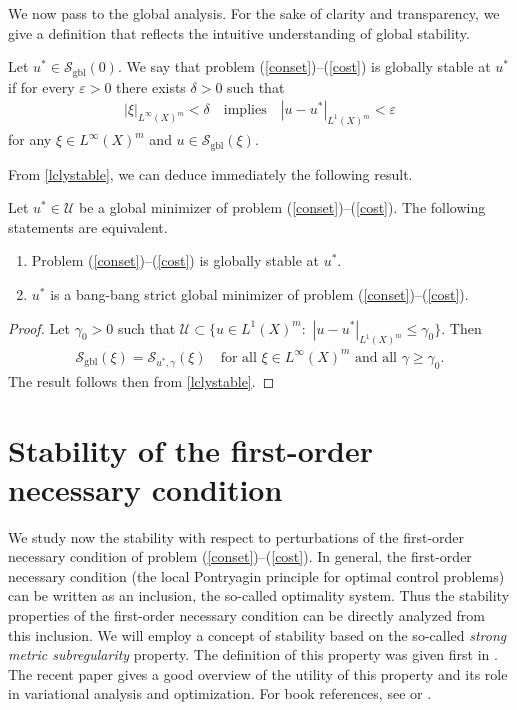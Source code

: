 \documentclass[hidelinks,onefignum,onetabnum]{siamart220329}
\begin{document}
We now pass to the global analysis. For the sake of clarity and transparency, we give a definition that  reflects the intuitive understanding of global stability.

\begin{definition}\label{locdefgbl}
	Let $u^*\in\mathcal S_{\text{gbl}}(0)$. We say that problem (\ref{conset})--(\ref{cost}) is globally stable at $u^*$ if for every $\varepsilon>0$ there exists $\delta>0$ such that 
	\begin{align*}
		|\xi|_{{L^\infty(X)^m}}<\delta \quad\text{implies}\quad |u-u^*|_{{L^1(X)^m}}<\varepsilon
	\end{align*}
	for any $\xi\in L^\infty(X)^m$ and  $u\in\mathcal S_{\text{gbl}}(\xi)$.
\end{definition}

From \cref{lclystable}, we can deduce immediately the following result.

\begin{corollary}
	Let $u^*\in\mathcal U$ be a global minimizer of problem (\ref{conset})--(\ref{cost}). The following statements are equivalent.
	\begin{enumerate}
		\item Problem (\ref{conset})--(\ref{cost}) is  globally stable at $u^*$.
		
		\item $u^*$ is a bang-bang strict global minimizer of problem (\ref{conset})--(\ref{cost}).
	\end{enumerate}
\end{corollary}
\begin{proof}
	Let $\gamma_0>0$ such that $\mathcal U\subset\{u\in L^1(X)^m:\,\, |u-u^*|_{L^1(X)^m}\le\gamma_0\}$. Then 
	\begin{align*}
		\mathcal S_{\text{gbl}}(\xi)=\mathcal S_{u^*,\gamma}(\xi)\quad\text{for all $\xi\in L^\infty(X)^m$ and all $\gamma\ge \gamma_0$}.
	\end{align*}
	The result follows then from  \cref{lclystable}.
\end{proof}
\section{Stability of the first-order necessary condition}\label{Ssubreg}

We study now the stability with respect to  perturbations of  the first-order necessary condition of problem (\ref{conset})--(\ref{cost}).  In general, the first-order necessary condition (the local Pontryagin principle for optimal control problems) can be written as an inclusion, the so-called optimality system. Thus the stability properties of the first-order necessary condition can be directly analyzed from this inclusion. We will employ a concept of stability based on  the so-called \textit{strong metric subregularity} property. The definition of this property was given first in \cite[Definition 5.1]{RSsubReg}. The recent paper \cite{Smsr} gives a good overview of the utility of this property and its role in  variational analysis and optimization. For book references, see \cite[Lecture 12]{LecVar} or  \cite[Section 3I]{Imsm}.
\end{document}
